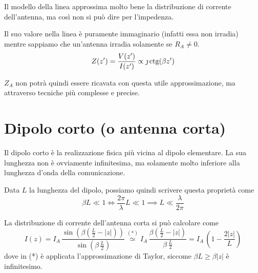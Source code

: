 Il modello della linea approssima molto bene la distribuzione di corrente dell'antenna, ma così non si può dire per l'impedenza.

Il suo valore nella linea è puramente immaginario (infatti essa non irradia) mentre sappiamo che un'antenna irradia solamente se $R_A \neq 0$.
\begin{equation}
	Z(z^{\prime}) = \frac{V(z^{\prime})}{I(z^{\prime})} \propto \jmath \operatorname{ctg}( \beta z^{\prime})
\end{equation}

$Z_A$ non potrà quindi essere ricavata con questa utile approssimazione, ma attraverso tecniche più complesse e precise.

\section{Dipolo corto (o antenna corta)}

Il dipolo corto è la realizzazione fisica più vicina al dipolo elementare.
La sua lunghezza non è ovviamente infinitesima, ma solamente molto inferiore alla lunghezza d'onda della comunicazione.

Data $L$ la lunghezza del dipolo, possiamo quindi scrivere questa proprietà come
\begin{equation}
	\beta L \ll 1
	\Longleftrightarrow \frac{2 \pi}{\lambda} L \ll 1
	\implies L \ll \frac{\lambda}{2 \pi}
\end{equation}

La distribuzione di corrente dell'antenna corta si può calcolare come
\begin{equation} \label{eq:corrente_dipolo_corto}
	I(z)
	= I_A \,
	\frac {\sin \left(
		\beta \left(
			\frac{L}{2} - |z|
		\right)
	\right)} {\sin \left( \beta \, \frac{L}{2}\right)}
	\stackrel{(*)}{\simeq} I_A \,
	\frac {\beta \left(
			\frac{L}{2} - |z|
		\right)} {\beta \, \frac{L}{2}}
	= I_A \, \left(
			1 - \frac{2 |z|}{L}
	\right)
\end{equation}
dove in (*) è applicata l'approssimazione di Taylor, siccome $\beta L \ge \beta |z|$ è infinitesimo.

